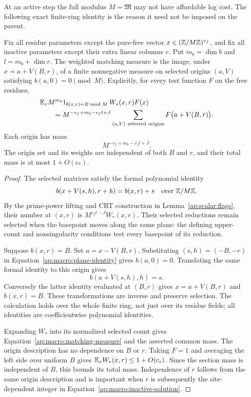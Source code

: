 At an active step the full modulus $M=\mathfrak M$ may not have
affordable log cost.  The following exact finite-ring identity is the
reason it need not be imposed on the parent.

\begin{lemma}\label{ap:macro:sections}
Fix all residue parameters except the pure-free vector
$x\in(\mathbb Z/M\mathbb Z)^{v_f}$, and fix all inactive parameters except their
extra linear columns $r$.  Put $m_b=\dim b$ and
$l=m_b+\dim r$.  The weighted matching measure is the image, under
$x=a+V(B,r)$, of a finite nonnegative measure on selected origins
$(a,V)$ satisfying $b(a,0)=0\pmod M$.  Explicitly, for every test
function $F$ on the free residues,
\begin{equation}\label{ap:macro:matching-measure}
 \begin{split}
 &\mathbb E_x M^{m_b}1_{b(x,r)=B\bmod M}\,W_*(x,r)F(x)\\
 &\qquad=M^{-v_f+m_b-v_fl+J}
       \sum_{(a,V)\ \mathrm{selected\ origins}}F\bigl(a+V(B,r)\bigr).
 \end{split}
\end{equation}
Each origin has mass
\[
                    M^{-v_f+m_b-v_fl+J}.
\]
The origin set and its weights are independent of both $B$ and $r$,
and their total mass is at most $1+O(c_*)$.
\end{lemma}

\begin{proof}
The selected matrices satisfy the formal polynomial identity
\begin{equation}\label{ap:macro:plane-identity}
 b(x+V(s,h),r+h)=b(x,r)+s
                         \quad\hbox{over }\mathbb Z/M\mathbb Z.
\end{equation}
By the prime-power lifting and CRT construction in
Lemma~\ref{ap:scalar:flags}, their number at $(x,r)$ is
$M^{v_fl-J}W_*(x,r)$.  Their selected reductions remain selected
when the basepoint moves along the same plane: the defining upper-count
and nonsingularity conditions test every basepoint of its reduction.

Suppose $b(x,r)=B$.  Set $a=x-V(B,r)$.  Substituting
$(s,h)=(-B,-r)$ in Equation~\eqref{ap:macro:plane-identity} gives
$b(a,0)=0$.  Translating the same formal identity to this origin gives
\[
                         b(a+V(s,h),h)=s.
\]
Conversely the latter identity evaluated at $(B,r)$ gives
$x=a+V(B,r)$ and $b(x,r)=B$.  These transformations are inverse and
preserve selection.  The calculation holds over the whole finite ring,
not just over its residue fields; all identities are coefficientwise
polynomial identities.

Expanding $W_*$ into its normalized selected count gives
Equation~\eqref{ap:macro:matching-measure} and the asserted common
mass.  The origin description has no dependence on $B$ or $r$.
Taking $F=1$ and averaging the left side over uniform $B$ gives
$\mathbb E_x W_*(x,r)\le1+O(c_*)$.  Since the section mass is independent
of $B$, this bounds its total mass.  Independence of $r$ follows from
the same origin description and is important when $r$ is subsequently
the site-dependent integer in
Equation~\eqref{ap:macro:inactive-solution}.
\end{proof}

